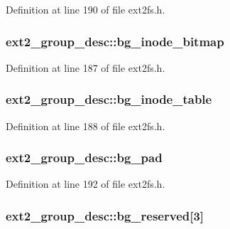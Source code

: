 \-Definition at line 190 of file ext2fs.\-h.

\hypertarget{structext2__group__desc_a7ba3737304b14529a45aede6381aa968}{
\subsubsection[{bg\-\_\-inode\-\_\-bitmap}]{ {\bf ext2\-\_\-group\-\_\-desc\-::bg\-\_\-inode\-\_\-bitmap}}}\label{structext2__group__desc_a7ba3737304b14529a45aede6381aa968}


\-Definition at line 187 of file ext2fs.\-h.

\hypertarget{structext2__group__desc_abf527c572a5fe30354cdf2cfc4f88b26}{
\subsubsection[{bg\-\_\-inode\-\_\-table}]{ {\bf ext2\-\_\-group\-\_\-desc\-::bg\-\_\-inode\-\_\-table}}}\label{structext2__group__desc_abf527c572a5fe30354cdf2cfc4f88b26}


\-Definition at line 188 of file ext2fs.\-h.

\hypertarget{structext2__group__desc_ac99983cee73aa4aace5c7d51b6d5a7e1}{
\subsubsection[{bg\-\_\-pad}]{ {\bf ext2\-\_\-group\-\_\-desc\-::bg\-\_\-pad}}}\label{structext2__group__desc_ac99983cee73aa4aace5c7d51b6d5a7e1}


\-Definition at line 192 of file ext2fs.\-h.

\hypertarget{structext2__group__desc_aff7f7dc0b67aed284218b238991f5c93}{
\subsubsection[{bg\-\_\-reserved}]{ {\bf ext2\-\_\-group\-\_\-desc\-::bg\-\_\-reserved}\mbox{[}3\mbox{]}}}\label{structext2__group__desc_aff7f7dc0b67aed284218b238991f5c93}


